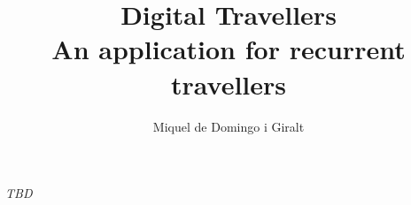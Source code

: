 \documentclass[a4paper, 11pt, oneside]{book}
\date{}
\title{
\textbf{\huge Digital Travellers}
\\[8pt]
{An application for recurrent travellers}
}
\author{Miquel de Domingo i Giralt}
\begin{document}
\frontmatter
\maketitle
\newpage\null\thispagestyle{empty}\newpage
\thispagestyle{empty}
\begin{flushright}
	\emph{TBD}
\end{flushright}
\newpage
\thispagestyle{empty}
\tableofcontents
\newpage
\listoffigures
\newpage
\listoftables
\newpage\null\thispagestyle{empty}\newpage
\mainmatter










\end{document}
